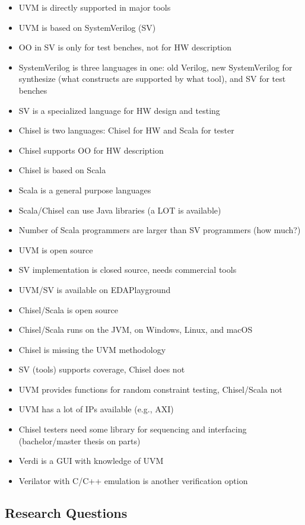 \documentclass[a4paper, conference]{IEEEtran}
\begin{document}
\begin{itemize}
\item UVM is directly supported in major tools
\item UVM is based on SystemVerilog (SV)
\item OO in SV is only for test benches, not for HW description
\item SystemVerilog is three languages in one: old Verilog, new SystemVerilog for synthesize
(what constructs are supported by what tool), and SV for test benches
\item SV is a specialized language for HW design and testing
\item Chisel is two languages: Chisel for HW and Scala for tester
\item Chisel supports OO for HW description
\item Chisel is based on Scala
\item Scala is a general purpose languages
\item Scala/Chisel can use Java libraries (a LOT is available)
\item Number of Scala programmers are larger than SV programmers (how much?)
\item UVM is open source
\item SV implementation is closed source, needs commercial tools
\item UVM/SV is available on EDAPlayground
\item Chisel/Scala is open source
\item Chisel/Scala runs on the JVM, on Windows, Linux, and macOS
\item Chisel is missing the UVM methodology
\item SV (tools) supports coverage, Chisel does not
\item UVM provides functions for random constraint testing, Chisel/Scala not
\item UVM has a lot of IPs available (e.g., AXI)
\item Chisel testers need some library for sequencing and interfacing (bachelor/master thesis on parts)
\item Verdi is a GUI with knowledge of UVM
\item Verilator with C/C++ emulation is another verification option
\end{itemize}

\subsection{Research Questions}
\end{document}
